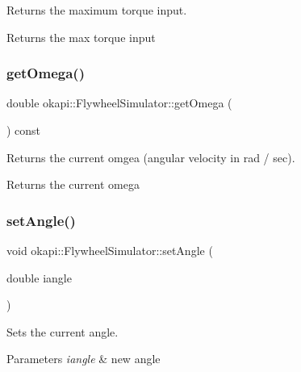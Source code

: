 Returns the maximum torque input.

\begin{DoxyReturn}{Returns}
the max torque input 
\end{DoxyReturn}
\mbox{\label{classokapi_1_1FlywheelSimulator_a27636d62f018187f5858f2244d2b3f82}} 
\subsubsection{\texorpdfstring{getOmega()}{getOmega()}}
{\footnotesize\ttfamily double okapi\+::\+Flywheel\+Simulator\+::get\+Omega (\begin{DoxyParamCaption}{ }\end{DoxyParamCaption}) const}

Returns the current omgea (angular velocity in rad / sec).

\begin{DoxyReturn}{Returns}
the current omega 
\end{DoxyReturn}
\mbox{\label{classokapi_1_1FlywheelSimulator_ad9decd27371e9058f97a49944f06b4a1}} 
\subsubsection{\texorpdfstring{setAngle()}{setAngle()}}
{\footnotesize\ttfamily void okapi\+::\+Flywheel\+Simulator\+::set\+Angle (\begin{DoxyParamCaption}\item[{double}]{iangle }\end{DoxyParamCaption})}

Sets the current angle.


\begin{DoxyParams}{Parameters}
{\em iangle} & new angle \\
\hline
\end{DoxyParams}
\mbox{\label{classokapi_1_1FlywheelSimulator_abc346f1446a476dc0c3571deabc79581}} 
